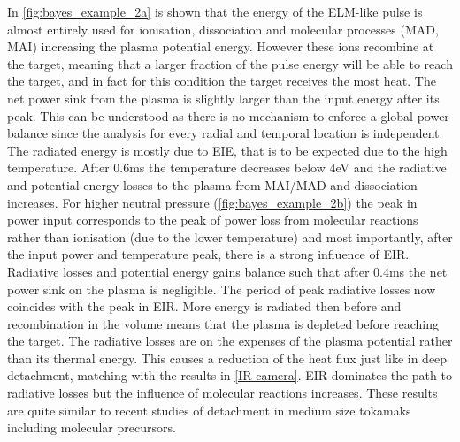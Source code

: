 In \autoref{fig:bayes_example_2a} is shown that the energy of the ELM-like pulse is almost entirely used for ionisation, dissociation and molecular processes (MAD, MAI) increasing the plasma potential energy. However these ions recombine at the target, meaning that a larger fraction of the pulse energy will be able to reach the target, and in fact for this condition the target receives the most heat. The net power sink from the plasma is slightly larger than the input energy after its peak. This can be understood as there is no mechanism to enforce a global power balance since the analysis for every radial and temporal location is independent. The radiated energy is mostly due to EIE, that is to be expected due to the high temperature. After 0.6ms the temperature decreases below 4eV and the radiative and potential energy losses to the plasma from MAI/MAD and dissociation increases.
For higher neutral pressure (\autoref{fig:bayes_example_2b}) the peak in power input corresponds to the peak of power loss from molecular reactions rather than ionisation (due to the lower temperature) and most importantly, after the input power and temperature peak, there is a strong influence of EIR. Radiative losses and potential energy gains balance such that after 0.4ms the net power sink on the plasma is negligible.\cite{Verhaegh2019} The period of peak radiative losses now coincides with the peak in EIR. More energy is radiated then before and recombination in the volume means that the plasma is depleted before reaching the target. The radiative losses are on the expenses of the plasma potential rather than its thermal energy. This causes a reduction of the heat flux just like in deep detachment, matching with the results in \autoref{IR camera}. EIR dominates the path to radiative losses but the influence of molecular reactions increases.
These results are quite similar to recent studies of detachment in medium size tokamaks including molecular precursors.\cite{Verhaegh2022,Verhaegh2021}

